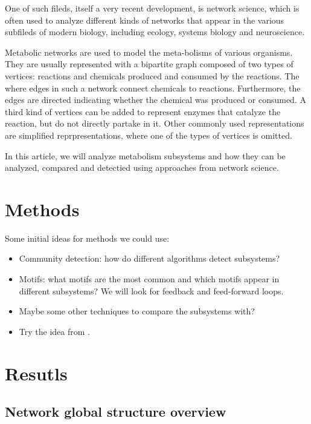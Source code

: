 One of such fileds, itself a very recent development, is network science, which
is often used to analyze different kinds of networks that appear in the various
subfileds of modern biology, including ecology\cite{proulx2005network}, systems
biology\cite{barabasi2004network} and
neuroscience\cite{sporns2014contributions}.

Metabolic networks\cite{jeong2000large} are used to model the meta-bolisms of
various organisms. They are usually represented with a bipartite graph composed
of two types of vertices: reactions and chemicals produced and consumed by the
reactions. The where edges in such a network connect chemicals to
reactions. Furthermore, the edges are directed indicating whether the chemical
was produced or consumed. A third kind of vertices can be added to represent
enzymes that catalyze the reaction, but do not directly partake in
it. Other commonly used representations are simplified reprpresentations, where
one of the types of vertices is omitted\cite{newman2010networks}.

In this article, we will analyze metabolism subsystems and how they can be
analyzed, compared and detectied using approaches from network science.

\section{Methods}

Some initial ideas for methods we could use:

\begin{itemize}
\item
  Community detection: how do different algorithms detect subsystems?
\item
  Motifs: what motifs are the most common and which motifs appear in different
  subsystems? We will look for feedback and feed-forward loops.
\item
  Maybe some other techniques to compare the subsystems with?
\item
  Try the idea from \cite{holme2003subnetwork}.
\end{itemize}

\section{Resutls}
\label{sec:results}

\subsection{Network global structure overview}

